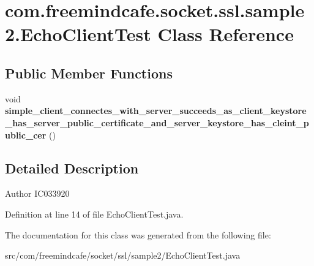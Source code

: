 \hypertarget{classcom_1_1freemindcafe_1_1socket_1_1ssl_1_1sample2_1_1_echo_client_test}{}\section{com.\+freemindcafe.\+socket.\+ssl.\+sample2.\+Echo\+Client\+Test Class Reference}
\label{classcom_1_1freemindcafe_1_1socket_1_1ssl_1_1sample2_1_1_echo_client_test}
\subsection*{Public Member Functions}
\begin{DoxyCompactItemize}
\item 
\hypertarget{classcom_1_1freemindcafe_1_1socket_1_1ssl_1_1sample2_1_1_echo_client_test_ab43458f4ffa53173fa520c1e3a16f118}{}void {\bfseries simple\+\_\+client\+\_\+connectes\+\_\+with\+\_\+server\+\_\+succeeds\+\_\+as\+\_\+client\+\_\+keystore\+\_\+has\+\_\+server\+\_\+public\+\_\+certificate\+\_\+and\+\_\+server\+\_\+keystore\+\_\+has\+\_\+cleint\+\_\+public\+\_\+cer} ()\label{classcom_1_1freemindcafe_1_1socket_1_1ssl_1_1sample2_1_1_echo_client_test_ab43458f4ffa53173fa520c1e3a16f118}

\end{DoxyCompactItemize}


\subsection{Detailed Description}
\begin{DoxyAuthor}{Author}
I\+C033920 
\end{DoxyAuthor}


Definition at line 14 of file Echo\+Client\+Test.\+java.



The documentation for this class was generated from the following file\+:\begin{DoxyCompactItemize}
\item 
src/com/freemindcafe/socket/ssl/sample2/Echo\+Client\+Test.\+java\end{DoxyCompactItemize}
